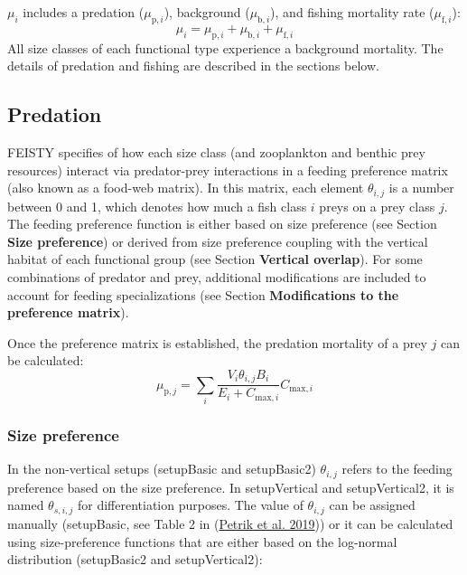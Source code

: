 \documentclass[
]{article}
\begin{document}
\(\mu_i\) includes a predation (\(\mu_{\mathrm{p},i}\)), background
(\(\mu_{\mathrm{b},i}\)), and fishing mortality rate
(\(\mu_{\mathrm{f},i}\)): \begin{equation}
\mu_i = \mu_{\mathrm{p},i}+\mu_{\mathrm{b},i}+\mu_{\mathrm{f},i}
\end{equation} All size classes of each functional type experience a
background mortality. The details of predation and fishing are described
in the sections below.

\hypertarget{predation}{%
\subsection{Predation}\label{predation}}

FEISTY specifies of how each size class (and zooplankton and benthic
prey resources) interact via predator-prey interactions in a feeding
preference matrix (also known as a food-web matrix). In this matrix,
each element \(\theta_{i,j}\) is a number between 0 and 1, which denotes
how much a fish class \(i\) preys on a prey class \(j\). The feeding
preference function is either based on size preference (see Section
\textbf{Size preference}) or derived from size preference coupling with
the vertical habitat of each functional group (see Section
\textbf{Vertical overlap}). For some combinations of predator and prey,
additional modifications are included to account for feeding
specializations (see Section \textbf{Modifications to the preference
matrix}).

Once the preference matrix is established, the predation mortality of a
prey \(j\) can be calculated: \begin{equation}
\mu_{\mathrm{p},j} = \sum_i  \frac{V_i \theta_{i,j}  B_i}{E_i+C_{\mathrm{max},i}} C_{\mathrm{max},i}
\end{equation}

\hypertarget{size-preference}{%
\subsubsection{Size preference}\label{size-preference}}

In the non-vertical setups (setupBasic and setupBasic2) \(\theta_{i,j}\)
refers to the feeding preference based on the size preference. In
setupVertical and setupVertical2, it is named \(\theta_{s,i,j}\) for
differentiation purposes. The value of \(\theta_{i,j}\) can be assigned
manually (setupBasic, see Table 2 in
(\protect\hyperlink{ref-petrik2019bottom}{Petrik et al. 2019})) or it
can be calculated using size-preference functions that are either based
on the log-normal distribution (setupBasic2 and setupVertical2):
\end{document}
